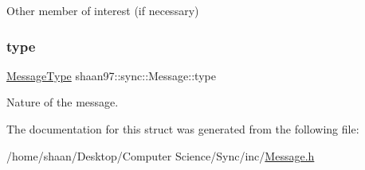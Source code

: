 Other member of interest (if necessary) 

\mbox{\label{structshaan97_1_1sync_1_1_message_a690d35bec280963fc0a20d71dcd53b46}} 
\subsubsection{\texorpdfstring{type}{type}}
{\footnotesize\ttfamily \hyperlink{namespaceshaan97_1_1sync_a902024d98481afc28794167b4524f537}{Message\+Type} shaan97\+::sync\+::\+Message\+::type}



Nature of the message. 



The documentation for this struct was generated from the following file\+:\begin{DoxyCompactItemize}
\item 
/home/shaan/\+Desktop/\+Computer Science/\+Sync/inc/\hyperlink{_message_8h}{Message.\+h}\end{DoxyCompactItemize}
